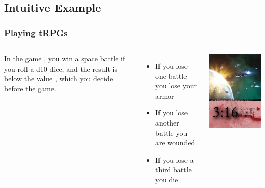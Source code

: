 \documentclass{beamer}
\begin{document}
\subsection{Intuitive Example}
\begin{frame}
  \frametitle{Playing tRPGs}

  \begin{columns}
    In the game , you \alert{win a space battle} if you
    roll a d10 dice, and the result is below the value ,
    which you decide before the game.
    
    \bigskip
    
    \begin{itemize}
    \item If you lose one battle \alert{you lose your armor}
    \item If you lose another battle \alert{you are wounded}
    \item If you lose a third battle \alert{you die}
    \end{itemize}
    \includegraphics[width=1\textwidth]{../img/316}
  \end{columns}  
\end{frame}
\end{document}
